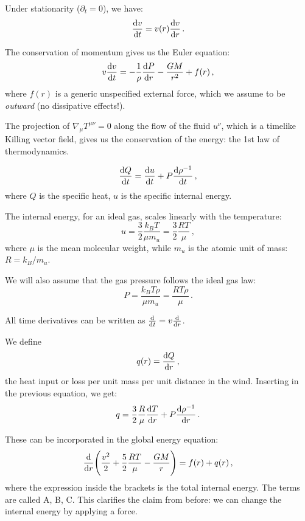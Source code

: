 \documentclass[main.tex]{subfiles}
\begin{document}
Under stationarity (\(\partial_t = 0\)), we have: 
%
\begin{equation}
  \dv{v}{t} = v(r) \dv{v}{r} 
\,.
\end{equation}
%

The conservation of momentum gives us the Euler equation: 
%
\begin{equation}
  v \dv{v}{t} = - \frac{1}{\rho } \dv{P}{r} - \frac{GM}{r^2} + f(r)
\,,
\end{equation}
%
where \(f(r)\) is a generic unspecified external force, which we assume to be \emph{outward} (no dissipative effects!).

\begin{bluebox}
    The projection of \(\nabla_{\mu }T^{\mu \nu }= 0\) along the flow of the fluid \(u^{\nu }\), which is a timelike Killing vector field, gives us the conservation of the energy: the 1st law of thermodynamics. 
\end{bluebox}

%
\begin{equation}
  \dv{Q}{t} = \dv{u}{t} + P \dv{\rho^{-1}}{t} 
\,,
\end{equation}
%
where \(Q\) is the specific heat, \(u \) is the specific internal energy.

The internal energy, for an ideal gas, scales linearly with the temperature: 
%
\begin{equation}
  u = \frac{3}{2} \frac{k_B T}{\mu m_u} = \frac{3}{2} \frac{R T}{\mu }
\,,
\end{equation}
%
where \(\mu \) is the mean molecular weight, while \(m_u\) is the atomic unit of mass: \(R = k_B / m_u\).

We will also assume that the gas pressure follows the ideal gas law: 
%
\begin{equation}
  P = \frac{k_B T \rho }{\mu m_u} = \frac{RT \rho }{\mu }
\,.
\end{equation}
%

All time derivatives can be written as \(\dv{}{t} = v \dv{}{r} \).

We define 
%
\begin{equation}
  q(r) = \dv{Q}{r} 
\,,
\end{equation}
%
the heat input or loss per unit mass per unit distance in the wind. Inserting in the previous equation, we get: 
%
\begin{equation}
  q = \frac{3}{2} \frac{R}{\mu } \dv{T}{r} + P \dv{\rho^{-1}}{r} 
\,.
\end{equation}

These can be incorporated in the global energy equation: 
%
\begin{equation} \label{eq:energy-conservation-differential} 
  \dv{}{r} \qty(\frac{v^2}{2} + \frac{5}{2} \frac{RT}{\mu }- \frac{GM}{r}) = f(r) + q(r)
\,,
\end{equation}
%
where the expression inside the brackets is the total internal energy. The terms are called A, B, C.
This clarifies the claim from before: we can change the internal energy by applying a force.
\end{document}
